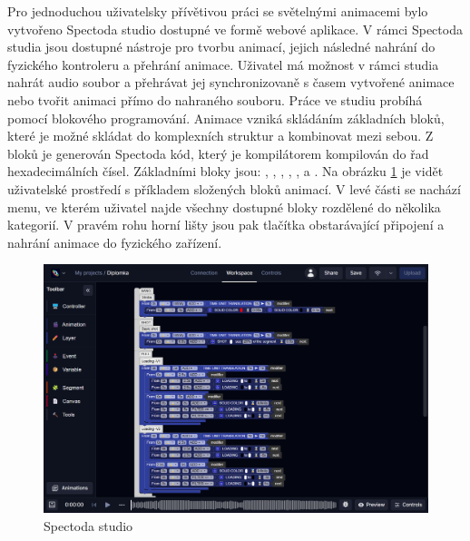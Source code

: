 Pro jednoduchou uživatelsky přívětivou práci se světelnými animacemi bylo vytvořeno Spectoda studio \cite{Spectoda} dostupné ve formě webové aplikace. V rámci Spectoda studia jsou dostupné nástroje pro tvorbu animací, jejich následné nahrání do fyzického kontroleru a přehrání animace. Uživatel má možnost v rámci studia nahrát audio soubor a přehrávat jej synchronizovaně s časem vytvořené animace nebo tvořit animaci přímo do nahraného souboru. Práce ve studiu probíhá pomocí blokového programování. Animace vzniká skládáním základních bloků, které je možné skládat do komplexních struktur a kombinovat mezi sebou. Z bloků je generován Spectoda kód, který je kompilátorem kompilován do řad hexadecimálních čísel. Základními bloky jsou:
,
,
,
,
,
 a
. Na obrázku \ref{fig:Spectoda_studio} je vidět uživatelské prostředí s příkladem složených bloků animací. V levé části se nachází menu, ve kterém uživatel najde všechny dostupné bloky rozdělené do několika kategorií. V pravém rohu horní lišty jsou pak tlačítka obstarávající připojení a nahrání animace do fyzického zařízení.

\begin{figure}[H]
  \centering
  \includegraphics[width = +\linewidth]{obrazky/Spectoda_studio.png}
  \caption{Spectoda studio}
  \label{fig:Spectoda_studio}
\end{figure}
 
